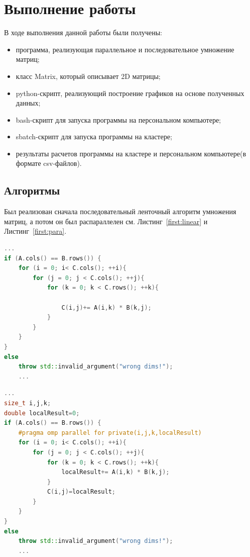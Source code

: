 \documentclass[12pt]{article}
\begin{document}
\section{Выполнение работы}
В ходе выполнения данной работы были получены:
	\begin{itemize}
		\item программа, реализующая параллельное и последовательное умножение матриц;
		\item класс Matrix, который описывает 2D матрицы;
		\item python-скрипт, реализующий построение графиков на основе полученных данных;
		\item bash-скрипт для запуска программы на персональном компьютере;
		\item sbatch-скрипт для запуска программы на кластере;
		\item результаты расчетов программы на кластере и персональном компьютере(в формате csv-файлов).
	\end{itemize}

\subsection{Алгоритмы}
Был реализован сначала последовательный ленточный алгоритм умножения матриц, а потом он был распараллелен см. Листинг~\ref{first:linear} и Листинг~\ref{first:para}.
	\begin{lstlisting}[language=c++,caption=реализация последовательного алгоритма,label=first:linear]
	...	
if (A.cols() == B.rows()) {
	for (i = 0; i< C.cols(); ++i){
		for (j = 0; j < C.cols(); ++j){   
			for (k = 0; k < C.rows(); ++k){
			
				C(i,j)+= A(i,k) * B(k,j);
			}
		}
	}	
}
else
	throw std::invalid_argument("wrong dims!");
	...
	\end{lstlisting}
	
	\begin{lstlisting}[language=c++,caption=реализация параллельного алгоритма,label=first:para]	
	...
size_t i,j,k;
double localResult=0;
if (A.cols() == B.rows()) {
	#pragma omp parallel for private(i,j,k,localResult)
	for (i = 0; i< C.cols(); ++i){
		for (j = 0; j < C.cols(); ++j){ 
			for (k = 0; k < C.rows(); ++k){
				localResult+= A(i,k) * B(k,j);
			}
			C(i,j)=localResult;
		}
	}
}
else
	throw std::invalid_argument("wrong dims!");
	...
	\end{lstlisting}
	
\end{document}
